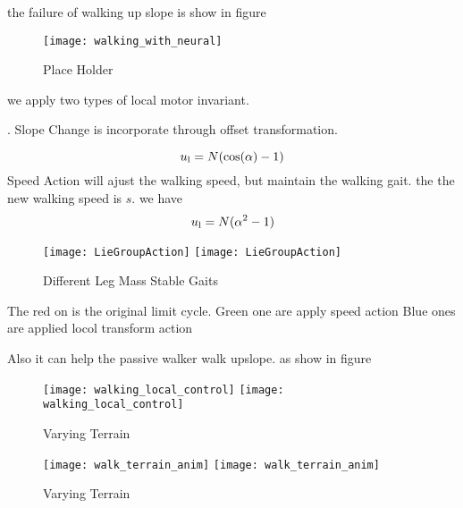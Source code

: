 the failure of walking up slope is show in figure

\begin{figure}[!htbp]
  \begin{center}
      \texttt{[image: walking\_with\_neural]}
    \caption{Place Holder}
    \label{fig:withoutlocalcontroller}
\end{center}
\end{figure}

we apply two types of local motor invariant.
\begin{itemize}

.
Slope Change is incorporate through offset transformation.

\[
u_{\mathrm{l}}=N(\mathrm{cos}(\alpha)-1)
\]
Speed Action will ajust the walking speed, but maintain the walking gait.
the the new walking speed is $s$.
we have
\[  
u_{\mathrm{l}}=N(\alpha^2-1)
\]
\end{itemize}

\begin{figure}[!htbp]
  \begin{center}
    \leavevmode
    \ifpdf
      \texttt{[image: LieGroupAction]}
    \else
      \texttt{[image: LieGroupAction]}
    \fi
    \caption{Different Leg Mass Stable Gaits}
    \label{fig:differentlr}
\end{center}
\end{figure}

The red on is the original limit cycle.
Green one are apply speed action
Blue ones are applied  locol transform action

Also it can help the passive walker walk upslope.
as show in figure


\begin{figure}[!htbp]
  \begin{center}
    \leavevmode
    \ifpdf
      \texttt{[image: walking\_local\_control]}
    \else
      \texttt{[image: walking\_local\_control]}
    \fi
    \caption{Varying Terrain}
    \label{fig:diffterrain}
\end{center}
\end{figure}




\begin{figure}[!htbp]
  \begin{center}
    \leavevmode
    \ifpdf
      \texttt{[image: walk\_terrain\_anim]}
    \else
      \texttt{[image: walk\_terrain\_anim]}
    \fi
    \caption{Varying Terrain}
    \label{fig:diffterrain}
\end{center}
\end{figure}



